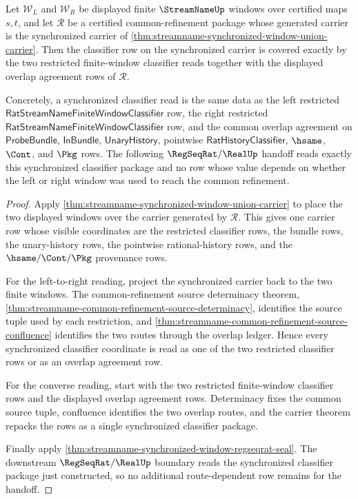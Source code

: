 \begin{theorem}
\label{thm:streamname-synchronized-window-union-classifier-coverage}
Let $\mathcal W_L$ and $\mathcal W_R$ be displayed finite
$\StreamNameUp$ windows over certified maps $s,t$, and let $\mathcal R$ be a
certified common-refinement package whose generated carrier is the
synchronized carrier of
\autoref{thm:streamname-synchronized-window-union-carrier}. Then the
classifier row on the synchronized carrier is covered exactly by the two
restricted finite-window classifier reads together with the displayed overlap
agreement rows of $\mathcal R$.

Concretely, a synchronized classifier read is the same data as the left
restricted $\mathsf{RatStreamNameFiniteWindowClassifier}$ row, the right
restricted $\mathsf{RatStreamNameFiniteWindowClassifier}$ row, and the common
overlap agreement on $\mathsf{ProbeBundle}$, $\mathsf{InBundle}$,
$\mathsf{UnaryHistory}$, pointwise $\mathsf{RatHistoryClassifier}$,
$\hsame$, $\Cont$, and $\Pkg$ rows. The following $\RegSeqRat/\RealUp$
handoff reads exactly this synchronized classifier package and no row whose
value depends on whether the left or right window was used to reach the
common refinement.
\end{theorem}
\begin{proof}
Apply \autoref{thm:streamname-synchronized-window-union-carrier} to place the
two displayed windows over the carrier generated by $\mathcal R$. This gives
one carrier row whose visible coordinates are the restricted classifier rows,
the bundle rows, the unary-history rows, the pointwise rational-history rows,
and the $\hsame/\Cont/\Pkg$ provenance rows.

For the left-to-right reading, project the synchronized carrier back to the
two finite windows. The common-refinement source determinacy theorem,
\autoref{thm:streamname-common-refinement-source-determinacy}, identifies the
source tuple used by each restriction, and
\autoref{thm:streamname-common-refinement-source-confluence} identifies the
two routes through the overlap ledger. Hence every synchronized classifier
coordinate is read as one of the two restricted classifier rows or as an
overlap agreement row.

For the converse reading, start with the two restricted finite-window
classifier rows and the displayed overlap agreement rows. Determinacy fixes
the common source tuple, confluence identifies the two overlap routes, and the
carrier theorem repacks the rows as a single synchronized classifier package.

Finally apply \autoref{thm:streamname-synchronized-window-regseqrat-seal}.
The downstream $\RegSeqRat/\RealUp$ boundary reads the synchronized classifier
package just constructed, so no additional route-dependent row remains for the
handoff.
\end{proof}

